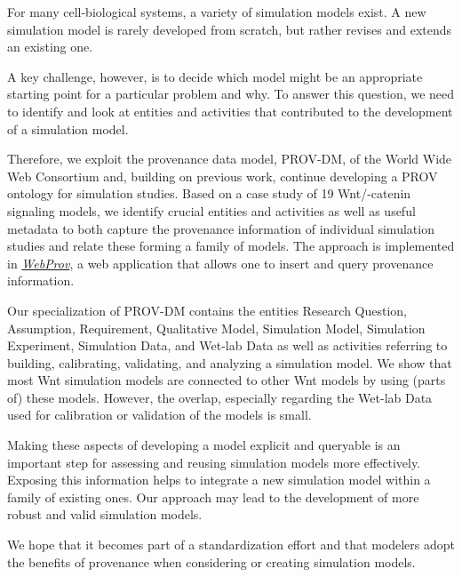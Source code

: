 \documentclass[10pt,letterpaper]{article}
\newcommand{\webprov}{\textit{WebProv}}
\newcommand{\bcat}{\textbeta-catenin}
\newcommand{\wnt}{Wnt}
\newcommand{\RQ}{Research Question}
\newcommand{\A}{Assumption}
\newcommand{\R}{Requirement}
\newcommand{\QM}{Qualitative Model}
\newcommand{\SM}{Simulation Model}
\newcommand{\SE}{Simulation Experiment}
\newcommand{\SD}{Simulation Data}
\newcommand{\WD}{Wet-lab Data}
\begin{document}
For many cell-biological systems, a variety of simulation models exist.
A new simulation model is rarely developed from scratch, but rather revises and extends an existing one.

A key challenge, however, is to decide which model might be an appropriate starting point for a particular problem and why.
To answer this question, we need to identify and look at entities and activities that contributed to the development of a simulation model.

Therefore, we exploit the provenance data model, PROV-DM, of the World Wide Web Consortium and, building on previous work, continue developing a PROV ontology for simulation studies.
Based on a case study of 19 \wnt{}/\bcat{} signaling models, we identify crucial entities and activities as well as useful metadata to both capture the provenance information of individual simulation studies and relate these forming a family of models.
The approach is implemented in \href{https://github.com/SFB-ELAINE/WebProv}{\webprov{}}, a web application that allows one to insert and query provenance information.

Our specialization of PROV-DM contains the entities \RQ{}, \A{}, \R{}, \QM{}, \SM{}, \SE{}, \SD{}, and \WD{} as well as activities referring to building, calibrating, validating, and analyzing a simulation model.
We show that most \wnt{} simulation models are connected to other \wnt{} models by using (parts of) these models.
However, the overlap, especially regarding the \WD{} used for calibration or validation of the models is small.

Making these aspects of developing a model explicit and queryable is an important step for assessing and reusing simulation models more effectively.
Exposing this information helps to integrate a new simulation model within a family of existing ones.
Our approach may lead to the development of more robust and valid simulation models.

We hope that it becomes part of a standardization effort and that modelers adopt the benefits of provenance when considering or creating simulation models.
\end{document}
